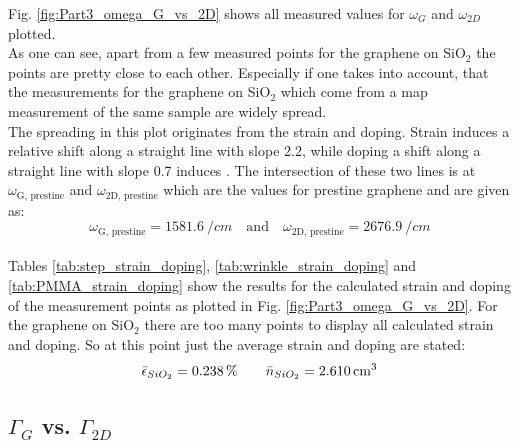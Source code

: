 \documentclass[12pt,a4paper]{article}
\begin{document}
Fig. \ref{fig:Part3_omega_G_vs_2D} shows all measured values for $\omega _G$ and $\omega _{2D}$ plotted. \\
As one can see, apart from a few measured points for the graphene on SiO$_2$ the points are pretty close to each other. Especially if one takes into account, that the measurements for the graphene on SiO$_2$ which come from a map measurement of the same sample are widely spread. \\
The spreading in this plot originates from the strain and doping. Strain induces a relative shift along a straight line with slope 2.2, while doping a shift along a straight line with slope 0.7 induces \cite{NeumannStampfer}. The intersection of these two lines is at $\omega _{\text{G, prestine}}$ and $\omega _{\text{2D, prestine}}$ which are the values for prestine graphene and are given as: 
\begin{equation*}
\omega _{\text{G, prestine}} = \SI{1581.6}{\per cm} \quad \text{and} \quad \omega _{\text{2D, prestine}} = \SI{2676.9}{\per cm}
\end{equation*} \\

Tables \ref{tab:step_strain_doping}, \ref{tab:wrinkle_strain_doping} and \ref{tab:PMMA_strain_doping} show the results for the calculated strain and doping of the measurement points as plotted in Fig. \ref{fig:Part3_omega_G_vs_2D}.  For the graphene on SiO$_2$ there are too many points to display all calculated strain and doping. So at this point just the average strain and doping are stated:
\begin{equation*}
\bar{\epsilon} _{SiO_2} = 0.238 \, \% \qquad \bar{n} _{SiO_2} = \SI{2.610}{\per c \cubic m}
\end{equation*}


\subsection{$\Gamma _G$ vs. $\Gamma _{2D}$}
\end{document}
